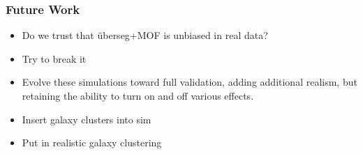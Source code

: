 \documentclass{beamer}
\newcommand{\uberseg}{{\"u}berseg}
\begin{document}
\frame
{
    \frametitle{Future Work}

    \begin{itemize}

        \item Do we trust that \uberseg+MOF is unbiased in real data?

        \item Try to break it

        \item Evolve these simulations toward full validation, adding
            additional realism, but retaining the ability to turn on and off
            various effects.

        \item Insert galaxy clusters into sim

        \item Put in realistic galaxy clustering

    \end{itemize}
}
\end{document}
